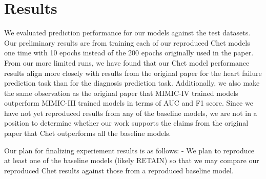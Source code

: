 \documentclass[11pt,a4paper,fleqn]{article}
\begin{document}
\section{Results}

We evaluated prediction performance for our models against the test datasets.
Our preliminary results are from training each of our reproduced Chet models one
time with 10 epochs instead of the 200 epochs originally used in the paper. From
our more limited runs, we have found that our Chet model performance results
align more closely with results from the original paper for the heart failure
prediction task than for the diagnosis prediction task. Additionally, we also
make the same observation as the original paper that MIMIC-IV trained models
outperform MIMIC-III trained models in terms of AUC and F1 score. Since we have not yet reproduced results from any of the baseline models, we are not
in a position to determine whether our work supports the claims from the original
paper that Chet outperforms all the baseline models.

Our plan for finalizing experiement results is as follows:
- We plan to reproduce at
least one of the baseline models (likely RETAIN) so that we may compare our
reproduced Chet results against those from a reproduced baseline model.
\end{document}
